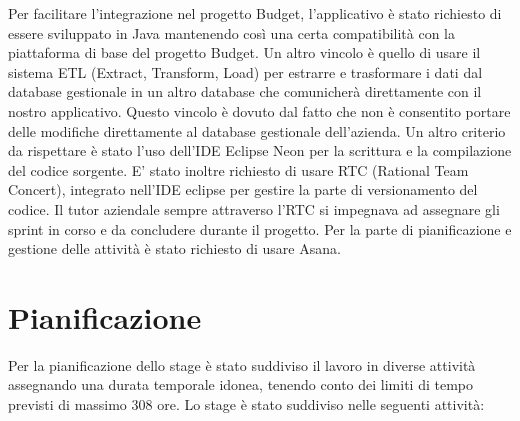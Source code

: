 Per facilitare l'integrazione nel progetto Budget, l'applicativo è stato richiesto di essere sviluppato in Java mantenendo così una certa compatibilità con la piattaforma di base del progetto Budget. Un altro vincolo è quello di usare il sistema ETL (Extract, Transform, Load) per estrarre e trasformare i dati dal database gestionale in un altro database che comunicherà direttamente con il nostro applicativo. Questo vincolo è dovuto dal fatto che non è consentito portare delle modifiche direttamente al database gestionale dell'azienda.
Un altro criterio da rispettare è stato l'uso  dell'IDE Eclipse Neon per la scrittura e la compilazione del codice sorgente. E' stato inoltre richiesto di usare RTC (Rational Team Concert), integrato nell'IDE eclipse per gestire la parte di versionamento del codice. Il tutor aziendale sempre attraverso l'RTC si impegnava ad assegnare gli sprint in corso e da concludere durante il progetto. Per la parte di pianificazione e gestione delle attività è stato richiesto di usare Asana.  \\

\section{Pianificazione}

Per la pianificazione dello stage è stato suddiviso il lavoro in diverse attività assegnando una durata temporale idonea, tenendo conto dei limiti di tempo previsti di massimo 308 ore. Lo stage è stato suddiviso nelle seguenti attività: \\

